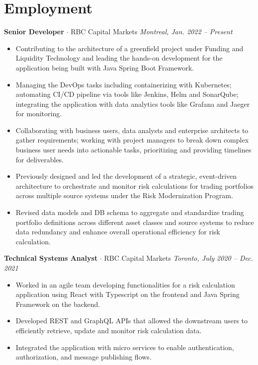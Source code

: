 \documentclass[a4paper,10pt]{article}
\newcommand{\jobentry}[4]{
    \noindent
    \textbf{\large#3}{ $\cdot$ }{#1} \hfill \textit{#2, #4}
    \vspace{-0.5em} %
}
\begin{document}
\section*{Employment}
\jobentry{RBC Capital Markets}{Montreal}{Senior Developer}{Jan. 2022 – Present}
\begin{itemize}[left=0em]
    \item Contributing to the architecture of a greenfield project under Funding and Liquidity Technology and leading the hands-on development for the application being built with Java Spring Boot Framework.
    \item Managing the DevOps tasks including containerizing with Kubernetes; automating CI/CD pipeline via tools like Jenkins, Helm and SonarQube; integrating the application with data analytics tools like Grafana and Jaeger for monitoring.
        \item Collaborating with business users, data analysts and enterprise architects to gather requirements; working with project managers to break down complex business user needs into actionable tasks, prioritizing and providing timelines for deliverables.
    \item Previously designed and led the development of a strategic, event-driven architecture to orchestrate and monitor risk calculations for trading portfolios across multiple source systems under the Risk Modernization Program.
    \item Revised data models and DB schema to aggregate and standardize trading portfolio definitions across different asset classes and source systems to reduce data redundancy and enhance overall operational efficiency for risk calculation.
    
\end{itemize}
\vspace{0.4em}
\jobentry{RBC Capital Markets}{Toronto}{Technical Systems Analyst}{July 2020 – Dec. 2021}
\begin{itemize}[left=0em]
    \item Worked in an agile team developing functionalities for a risk calculation application using React with Typescript on the frontend and Java Spring Framework on the backend.
    \item Developed REST and GraphQL APIs that allowed the downstream users to efficiently retrieve, update and monitor risk calculation data.
    \item Integrated the application with micro services to enable authentication, authorization, and message publishing flows.
\end{itemize}
\end{document}
